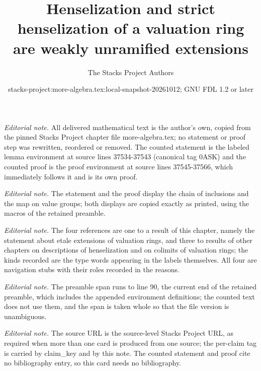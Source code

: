 \documentclass[10pt,a4paper]{amsart}
\title{Henselization and strict henselization of a valuation ring are weakly unramified extensions}
\author{The Stacks Project Authors}
\date{stacks-project:more-algebra.tex:local-snapshot-20261012; GNU FDL 1.2 or later}
\theoremstyle{plain}
\theoremstyle{definition}
\theoremstyle{remark}
\numberwithin{equation}{subsection}
\begin{document}
\maketitle
\setcounter{subsection}{1}
\noindent\textit{Editorial note.} All delivered mathematical text is the author's own, copied from the pinned Stacks Project chapter file more-algebra.tex; no statement or proof step was rewritten, reordered or removed. The counted statement is the labeled lemma environment at source lines 37534-37543 (canonical tag 0ASK) and the counted proof is the proof environment at source lines 37545-37566, which immediately follows it and is its own proof.\par\medskip
\noindent\textit{Editorial note.} The statement and the proof display the chain of inclusions and the map on value groups; both displays are copied exactly as printed, using the macros of the retained preamble.\par\medskip
\noindent\textit{Editorial note.} The four references are one to a result of this chapter, namely the statement about etale extensions of valuation rings, and three to results of other chapters on descriptions of henselization and on colimits of valuation rings; the kinds recorded are the type words appearing in the labels themselves. All four are navigation stubs with their roles recorded in the reasons.\par\medskip
\noindent\textit{Editorial note.} The preamble span runs to line 90, the current end of the retained preamble, which includes the appended environment definitions; the counted text does not use them, and the span is taken whole so that the file version is unambiguous.\par\medskip
\noindent\textit{Editorial note.} The source URL is the source-level Stacks Project URL, as required when more than one card is produced from one source; the per-claim tag is carried by claim\_key and by this note. The counted statement and proof cite no bibliography entry, so this card needs no bibliography.\par\medskip
\end{document}
